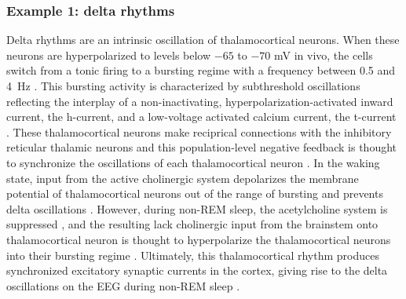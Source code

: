 \subsubsection{Example 1: delta rhythms}
Delta rhythms are an intrinsic oscillation of thalamocortical neurons. When these neurons are hyperpolarized to levels below $-65$ to $-70$ \unit{\milli\volt} in vivo, the cells switch from a tonic firing to a bursting regime with a frequency between 0.5 and \qty{4}{\hertz} \cite{Dossi1992}. This bursting activity is characterized by subthreshold oscillations reflecting the interplay of a non-inactivating, hyperpolarization-activated inward current, the h-current, and a low-voltage activated calcium current, the t-current \cite{McCormick1990,Soltesz1991}. These thalamocortical neurons make reciprical connections with the inhibitory reticular thalamic neurons and this population-level negative feedback is thought to synchronize the oscillations of each thalamocortical neuron \cite{Steriade1991, Steriade1993}. In the waking state, input from the active cholinergic system depolarizes the membrane potential of thalamocortical neurons out of the range of bursting and prevents delta oscillations \cite{Steriade2003}. However, during non-REM sleep, the acetylcholine system is suppressed \cite{Watson2010}, and the resulting lack cholinergic input from the brainstem onto thalamocortical neuron is thought to hyperpolarize the thalamocortical neurons into their bursting regime \cite{Steriade2003}. Ultimately, this thalamocortical rhythm produces synchronized excitatory synaptic currents in the cortex, giving rise to the delta oscillations on the EEG during non-REM sleep \cite{Amzica1998}.

